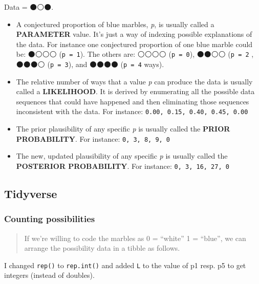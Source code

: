 \documentclass[
  letterpaper,
  DIV=11,
  numbers=noendperiod]{scrreprt}
\providecommand{\tightlist}{%
  \setlength{\itemsep}{0pt}\setlength{\parskip}{0pt}}\usepackage{longtable,booktabs,array}
\begin{document}
Data = ⚫⚪⚫.

\begin{itemize}
\tightlist
\item
  A conjectured proportion of blue marbles, \emph{p}, is usually called
  a \textbf{PARAMETER} value. It's just a way of indexing possible
  explanations of the data. For instance one conjectured proportion of
  one blue marble could be: ⚫⚪⚪⚪ (\texttt{p\ =\ 1}). The others are:
  ⚪⚪⚪⚪ (\texttt{p\ =\ 0}), ⚫⚫⚪⚪ (\texttt{p\ =\ 2} , ⚫⚫⚫⚪
  (\texttt{p\ =\ 3}), and ⚫⚫⚫⚫ (\texttt{p\ =\ 4} ways).
\item
  The relative number of ways that a value \emph{p} can produce the data
  is usually called a \textbf{LIKELIHOOD}. It is derived by enumerating
  all the possible data sequences that could have happened and then
  eliminating those sequences inconsistent with the data. For instance:
  \texttt{0.00,\ 0.15,\ 0.40,\ 0.45,\ 0.00}
\item
  The prior plausibility of any specific \emph{p} is usually called the
  \textbf{PRIOR PROBABILITY}. For instance: \texttt{0,\ 3,\ 8,\ 9,\ 0}
\item
  The new, updated plausibility of any specific \emph{p} is usually
  called the \textbf{POSTERIOR PROBABILITY}. For instance:
  \texttt{0,\ 3,\ 16,\ 27,\ 0}
\end{itemize}

\hypertarget{tidyverse-1}{%
\subsection{Tidyverse}\label{tidyverse-1}}

\hypertarget{counting-possibilities-1}{%
\subsubsection{Counting possibilities}\label{counting-possibilities-1}}

\begin{quote}
If we're willing to code the marbles as 0 = ``white'' 1 = ``blue'', we
can arrange the possibility data in a tibble as follows.
\end{quote}

\begin{tcolorbox}[enhanced jigsaw, colframe=quarto-callout-note-color-frame, colback=white, toprule=.15mm, breakable, arc=.35mm, bottomtitle=1mm, colbacktitle=quarto-callout-note-color!10!white, toptitle=1mm, titlerule=0mm, title=\textcolor{quarto-callout-note-color}{\faInfo}\hspace{0.5em}{Changed code slightly}, leftrule=.75mm, opacityback=0, rightrule=.15mm, opacitybacktitle=0.6, bottomrule=.15mm, left=2mm, coltitle=black]

I changed \texttt{rep()} to \texttt{rep.int()} and added \texttt{L} to
the value of p1 resp. p5 to get integers (instead of doubles).

\end{tcolorbox}
\end{document}
